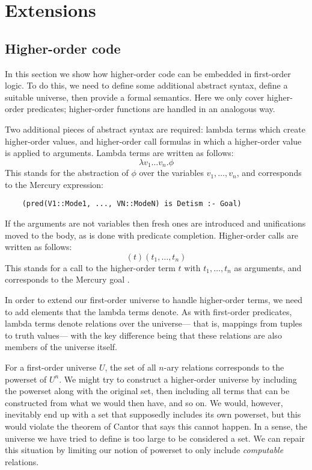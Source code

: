 \chapter{Extensions}
\label{sec:extensions}

\section{Higher-order code}
\label{sec:ho}

In this section we show how higher-order code
can be embedded in first-order logic.
To do this, we need to define some additional abstract syntax,
define a suitable universe,
then provide a formal semantics.
Here we only cover higher-order predicates;
higher-order functions are handled in an analogous way.

Two additional pieces of abstract syntax are required:
lambda terms which create higher-order values,
and higher-order call formulas in which
a higher-order value is applied to arguments.
Lambda terms are written as follows:
\[ \lambda v_1 \ldots v_n. \phi \]
This stands for the abstraction of $\phi$
over the variables $v_1, \ldots, v_n$,
and corresponds to the Mercury expression:
\begin{verbatim}
    (pred(V1::Mode1, ..., VN::ModeN) is Detism :- Goal)
\end{verbatim}
If the arguments are not variables
then fresh ones are introduced and unifications moved to the body,
as is done with predicate completion.
Higher-order calls are written as follows:
\[
(t)(t_1, \ldots, t_n)
\]
This stands for a call to the higher-order term $t$
with $t_1, \ldots, t_n$ as arguments,
and corresponds to the Mercury goal .

In order to extend our first-order universe
to handle higher-order terms,
we need to add elements that the lambda terms denote.
As with first-order predicates,
lambda terms denote relations over the universe---%
that is, mappings from tuples to truth values---%
with the key difference being that
these relations are also members of the universe itself.

For a first-order universe $U$,
the set of all $n$-ary relations corresponds to
the powerset of $U^n$.
We might try to construct a higher-order universe
by including the powerset along with the original set,
then including all terms
that can be constructed from what we would then have,
and so on.
We would, however, inevitably end up with a set
that supposedly includes its own powerset,
but this would violate the theorem of Cantor
that says this cannot happen.
In a sense,
the universe we have tried to define is too large to be considered a set.
We can repair this situation by limiting our notion of powerset
to only include \emph{computable} relations.

